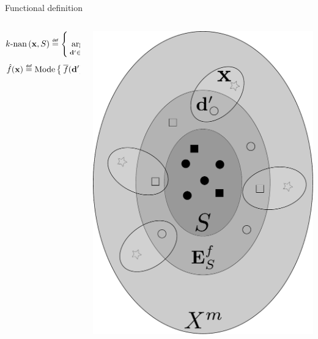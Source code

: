 \documentclass{beamer}
\begin{document}
\begin{frame}{Functional definition}
  \begin{columns}
    \begin{column}{.6\textwidth}
      $$
      k\text{-nan}\left(\mathbf{x}, S\right) \eqdef \Set{\argmin_{\mathbf{d}' \in
      A_E^Y(S)}^k
      \delta(\mathbf{x},\mathbf{d}')}
      $$
      $$\hat{f}(\mathbf{x}) \eqdef \text{Mode}\Set{\albl{\mathbf{d}'} | \mathbf{d}'
      \in k\text{-nan}\left(\mathbf{x}, S\right)}
      $$
    \end{column}
    \begin{column}{.4\textwidth}
      \begin{center}
        \includegraphics[width=.9\textwidth]{figures/extended_classifier.pdf}
      \end{center}
    \end{column}
  \end{columns}
\end{frame}
\end{document}
